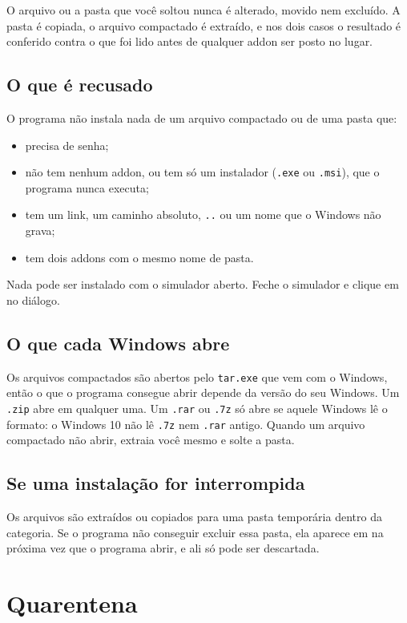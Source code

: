 \documentclass[11pt,a4paper]{article}
\begin{document}
O arquivo ou a pasta que você soltou nunca é alterado, movido nem excluído. A
pasta é copiada, o arquivo compactado é extraído, e nos dois casos o resultado
é conferido contra o que foi lido antes de qualquer addon ser posto no lugar.

\subsection{O que é recusado}

O programa não instala nada de um arquivo compactado ou de uma pasta que:

\begin{itemize}
  \item precisa de senha;
  \item não tem nenhum addon, ou tem só um instalador (\texttt{.exe} ou
    \texttt{.msi}), que o programa nunca executa;
  \item tem um link, um caminho absoluto, \texttt{..} ou um nome que o Windows
    não grava;
  \item tem dois addons com o mesmo nome de pasta.
\end{itemize}

Nada pode ser instalado com o simulador aberto. Feche o simulador e clique em
 no diálogo.

\subsection{O que cada Windows abre}

Os arquivos compactados são abertos pelo \texttt{tar.exe} que vem com o
Windows, então o que o programa consegue abrir depende da versão do seu
Windows. Um \texttt{.zip} abre em qualquer uma. Um \texttt{.rar} ou
\texttt{.7z} só abre se aquele Windows lê o formato: o Windows 10 não lê
\texttt{.7z} nem \texttt{.rar} antigo. Quando um arquivo compactado não abrir,
extraia você mesmo e solte a pasta.

\subsection{Se uma instalação for interrompida}

Os arquivos são extraídos ou copiados para uma pasta temporária dentro da
categoria. Se o programa não conseguir excluir essa pasta, ela aparece em
 na próxima vez que o programa abrir, e ali só pode
ser descartada.

\section{Quarentena}
\end{document}
